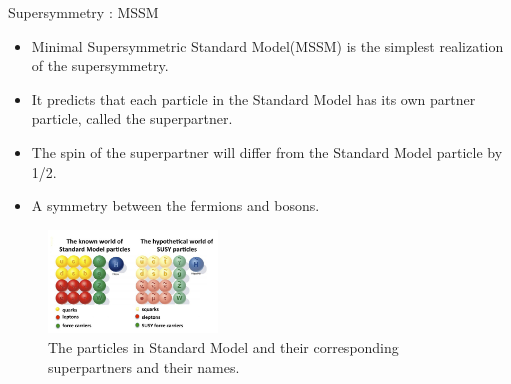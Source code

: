 \documentclass[mathserif,serif]{beamer}
\begin{document}
\begin{frame}{Supersymmetry : MSSM}
\begin{itemize}
\item Minimal Supersymmetric Standard Model(MSSM) is the simplest realization of the supersymmetry.
\item It predicts that each particle in the Standard Model has its own partner particle, called the superpartner.
\item The spin of the superpartner will differ from the Standard Model particle by 1/2.
\item A symmetry between the fermions and bosons.
\end{itemize}
\begin{figure}
\centering
\includegraphics[width=0.4\textwidth]{data/photo/theory/SM-SUSY-diagram.jpg}
\caption{The particles in Standard Model and their corresponding superpartners and their names.}
\end{figure}
\end{frame}
\end{document}
